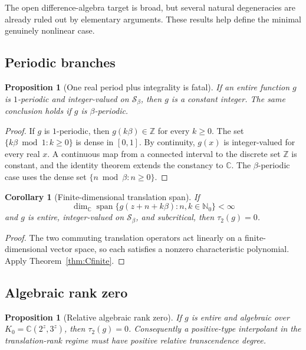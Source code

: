 \documentclass[11pt,oneside]{article}
\newtheorem{proposition}[theorem]{Proposition}
\newtheorem{corollary}[theorem]{Corollary}
\theoremstyle{definition}
\theoremstyle{remark}
\newcommand{\Nzero}{\mathbb N_0}
\newcommand{\Z}{\mathbb Z}
\newcommand{\C}{\mathbb C}
\newcommand{\Sbeta}{\mathcal S_\beta}
\newcommand{\Span}{\operatorname{span}}
\begin{document}
The open difference-algebra target is broad, but several natural degeneracies are already
ruled out by elementary arguments.  These results help define the minimal genuinely
nonlinear case.

\subsection{Periodic branches}

\begin{proposition}[One real period plus integrality is fatal]
\label{prop:periodicfatal}
If an entire function $g$ is $1$-periodic and integer-valued on $\Sbeta$, then $g$ is a
constant integer.  The same conclusion holds if $g$ is $\beta$-periodic.
\end{proposition}

\begin{proof}
If $g$ is $1$-periodic, then $g(k\beta)\in\Z$ for every $k\ge0$.  The set
$\{k\beta\bmod1:k\ge0\}$ is dense in $[0,1]$.  By continuity, $g(x)$ is integer-valued
for every real $x$.  A continuous map from a connected interval to the discrete set $\Z$
is constant, and the identity theorem extends the constancy to $\C$.  The
$\beta$-periodic case uses the dense set $\{n\bmod\beta:n\ge0\}$.
\end{proof}

\begin{corollary}[Finite-dimensional translation span]
\label{cor:finitedimspan}
If
\[
 \dim_\C\Span\{g(z+n+k\beta):n,k\in\Nzero\}<\infty
\]
and $g$ is entire, integer-valued on $\Sbeta$, and subcritical, then
$\tau_2(g)=0$.
\end{corollary}

\begin{proof}
The two commuting translation operators act linearly on a finite-dimensional vector space,
so each satisfies a nonzero characteristic polynomial.  Apply
Theorem~\ref{thm:Cfinite}.
\end{proof}

\subsection{Algebraic rank zero}

\begin{proposition}[Relative algebraic rank zero]
\label{prop:rankzero}
If $g$ is entire and algebraic over $K_0=\C(2^z,3^z)$, then $\tau_2(g)=0$.
Consequently a positive-type interpolant in the translation-rank regime must have positive
relative transcendence degree.
\end{proposition}
\end{document}
